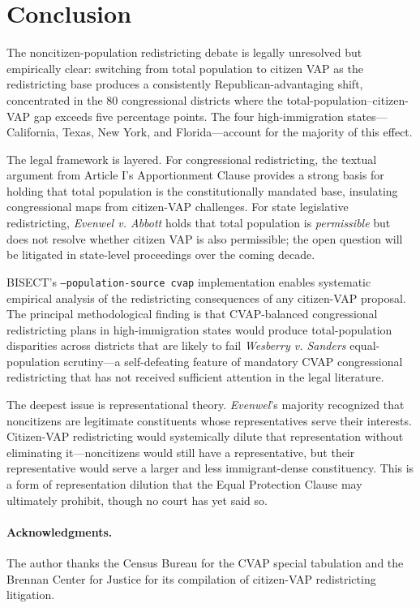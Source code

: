 \section{Conclusion}
\label{sec:conclusion}

The noncitizen-population redistricting debate is legally unresolved but empirically clear: switching from total population to citizen VAP as the redistricting base produces a consistently Republican-advantaging shift, concentrated in the 80 congressional districts where the total-population--citizen-VAP gap exceeds five percentage points. The four high-immigration states---California, Texas, New York, and Florida---account for the majority of this effect.

The legal framework is layered. For congressional redistricting, the textual argument from Article I's Apportionment Clause provides a strong basis for holding that total population is the constitutionally mandated base, insulating congressional maps from citizen-VAP challenges. For state legislative redistricting, \emph{Evenwel v. Abbott} holds that total population is \emph{permissible} but does not resolve whether citizen VAP is also permissible; the open question will be litigated in state-level proceedings over the coming decade.

BISECT's \texttt{--population-source cvap} implementation enables systematic empirical analysis of the redistricting consequences of any citizen-VAP proposal. The principal methodological finding is that CVAP-balanced congressional redistricting plans in high-immigration states would produce total-population disparities across districts that are likely to fail \emph{Wesberry v. Sanders} equal-population scrutiny---a self-defeating feature of mandatory CVAP congressional redistricting that has not received sufficient attention in the legal literature.

The deepest issue is representational theory. \emph{Evenwel}'s majority recognized that noncitizens are legitimate constituents whose representatives serve their interests. Citizen-VAP redistricting would systemically dilute that representation without eliminating it---noncitizens would still have a representative, but their representative would serve a larger and less immigrant-dense constituency. This is a form of representation dilution that the Equal Protection Clause may ultimately prohibit, though no court has yet said so.

\paragraph{Acknowledgments.}
The author thanks the Census Bureau for the CVAP special tabulation and the Brennan Center for Justice for its compilation of citizen-VAP redistricting litigation.
